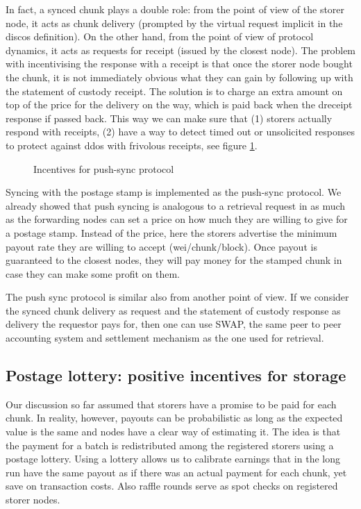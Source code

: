 In fact, a synced chunk plays a double role: from the point of view of the storer node, it acts as chunk delivery (prompted by the virtual request implicit in the discos definition). On the other hand, from the point of view of protocol dynamics, it acts as requests for receipt (issued by the closest node). The problem with incentivising the response with a receipt is that once the storer node bought the chunk, it is not immediately obvious what they can gain by following up with the statement of custody receipt. The solution is to charge an extra amount on top of the price for the delivery on the way,  which is paid back when the dreceipt response if passed back. This way we can make sure that (1) storers actually respond with receipts, (2) have a way to detect timed out or unsolicited responses to protect against ddos with frivolous receipts, see figure \ref{fig:syncing-swap}.


\begin{figure}[htbp]
\centering
% 
\caption{Incentives for push-sync protocol}
\label{fig:syncing-swap}
\end{figure}

Syncing with the postage stamp is implemented as the push-sync protocol. We already showed that push syncing is analogous to a retrieval request in as much as the forwarding nodes can set a price on how much they are willing to give for a postage stamp. Instead of the price, here the storers advertise the minimum payout rate they are willing to accept (wei/chunk/block). Once payout is guaranteed to the closest nodes, they will pay money for the stamped chunk in case they can make some profit on them. 

The push sync protocol is similar also from another point of view. If we consider the synced chunk delivery as request and the statement of custody response as delivery the requestor pays for, then one can use SWAP, the same peer to peer accounting system and settlement mechanism  as the one used for retrieval. 


\subsection{Postage lottery: positive incentives for storage}\label{sec:postage-lottery}

Our discussion so far assumed that storers have a promise to be paid for each chunk. In reality, however,  payouts can be probabilistic as long as the expected value is the same and  nodes have a clear way of estimating it. The idea is that the payment for a batch is redistributed among the registered storers using a postage lottery. Using a lottery allows us to calibrate earnings that in the long run have the same payout as if there was an actual payment for each chunk, yet save on transaction costs. Also raffle rounds serve as spot checks on registered storer nodes. 

